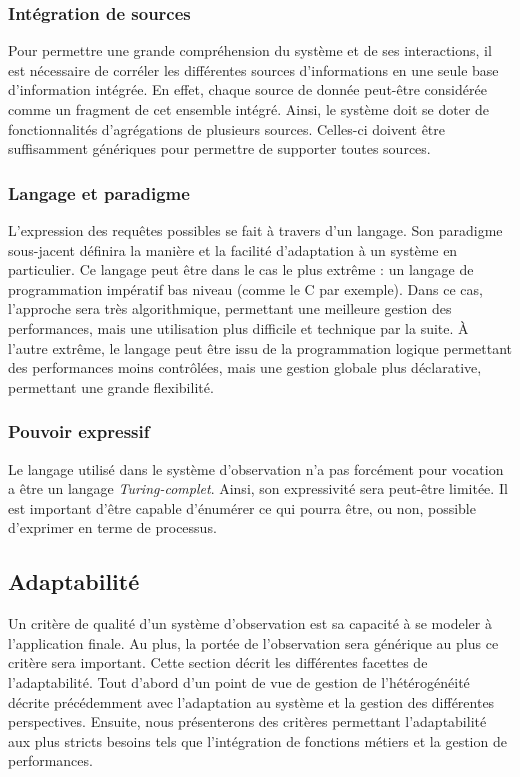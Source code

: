 \subsubsection{Intégration de sources}
Pour permettre une grande compréhension du système et de ses interactions, il est nécessaire de corréler les différentes sources d'informations en une seule base d'information intégrée. En effet, chaque source de donnée peut-être considérée comme un fragment de cet ensemble intégré. Ainsi, le système doit se doter de fonctionnalités d'agrégations de plusieurs sources. Celles-ci doivent être suffisamment génériques pour permettre de supporter toutes sources.

\subsubsection{Langage et paradigme}
L'expression des requêtes possibles se fait à travers d'un langage. Son paradigme sous-jacent définira la manière et la facilité d'adaptation à un système en particulier. Ce langage peut être dans le cas le plus extrême : un langage de programmation impératif bas niveau (comme le C par exemple). Dans ce cas, l'approche sera très algorithmique, permettant une meilleure gestion des performances, mais une utilisation plus difficile et technique par la suite. À l'autre extrême, le langage peut être issu de la programmation logique permettant des performances moins contrôlées, mais une gestion globale plus déclarative, permettant une grande flexibilité.

\subsubsection{Pouvoir expressif}
Le langage utilisé dans le système d'observation n'a pas forcément pour vocation a être un langage \textit{Turing-complet}. Ainsi, son expressivité sera peut-être limitée. Il est important d'être capable d'énumérer ce qui pourra être, ou non, possible d'exprimer en terme de processus.

\subsection{Adaptabilité}
Un critère de qualité d'un système d'observation est sa capacité à se modeler à l'application finale. Au plus, la portée de l'observation sera générique au plus ce critère sera important. Cette section décrit les différentes facettes de l'adaptabilité. Tout d'abord d'un point de vue de gestion de l'hétérogénéité décrite précédemment avec l'adaptation au système et la gestion des différentes perspectives. Ensuite, nous présenterons des critères permettant l'adaptabilité aux plus stricts besoins tels que l'intégration de fonctions métiers et la gestion de performances.

